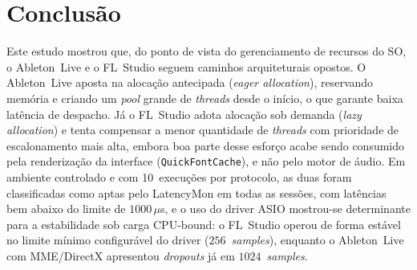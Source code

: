 \documentclass[tcc1]{classe_uftex/uftex}
\begin{document}
\chapter{Conclusão}

Este estudo mostrou que, do ponto de vista do gerenciamento de recursos
do SO, o Ableton~Live e o FL~Studio seguem caminhos arquiteturais
opostos. O Ableton~Live aposta na alocação antecipada
(\textit{eager allocation}), reservando memória e criando um
\textit{pool} grande de \textit{threads} desde o início, o que garante
baixa latência de despacho. Já o FL~Studio adota alocação sob demanda
(\textit{lazy allocation}) e tenta compensar a menor quantidade de
\textit{threads} com prioridade de escalonamento mais alta, embora boa
parte desse esforço acabe sendo consumido pela renderização da interface
(\texttt{QuickFontCache}), e não pelo motor de áudio. Em ambiente
controlado e com 10~execuções por protocolo, as duas foram classificadas
como aptas pelo LatencyMon em todas as sessões, com latências bem abaixo
do limite de $1000\,\mu$s, e o uso do driver ASIO mostrou-se determinante para a
estabilidade sob carga CPU-bound: o FL~Studio operou de forma
estável no limite mínimo configurável do driver
($256$~\textit{samples}), enquanto o Ableton~Live com MME/DirectX
apresentou \textit{dropouts} já em $1024$~\textit{samples}.



\end{document}
